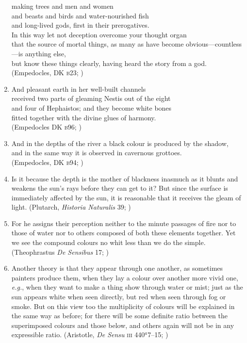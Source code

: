 \documentclass[10pt]{article}
\begin{document}
\begin{enumerate}
    making trees and men and women\\
    and beasts and birds and water-nourished fish\\
    and long-lived gods, first in their prerogatives.\\
    In this way let not deception overcome your thought organ\\
    that the source of mortal things, as many as have become obvious---countless---is anything else,\\
    but know these things clearly, having heard the story from a god.\\ 
    (Empedocles, DK \textsc{b}23; \citealt[27 231]{Inwood:2001ve})
    \item And pleasant earth in her well-built channels\\
    received two parts of gleaming Nestis out of the eight\\
    and four of Hephaistos; and they become white bones\\
    fitted together with the divine glues of harmony.\\
    (Empedocles DK \textsc{b}96; \citealt[62 245]{Inwood:2001ve})
    \item And in the depths of the river a black colour is produced by the shadow,\\
    and in the same way it is observed in cavernous grottoes.\\
    (Empedocles, DK \textsc{b}94; \citealt[105 261]{Inwood:2001ve})
    \item Is it because the depth is the mother of blackness inasmuch as it blunts and weakens the sun's rays before they can get to it? But since the surface is immediately affected by the sun, it is reasonable that it receives the gleam of light.  (Plutarch, \emph{Historia Naturalis} 39; \citealt[\textsc{CTXT}-87 137--138]{Inwood:2001ve})
	\item For he assigns their perception neither to the minute passages of fire nor to those of water nor to others composed of both these elements together. Yet we see the compound colours no whit less than we do the simple. (Theophrastus \emph{De Sensibus} 17; \citealt{Stratton:1917vn})
    \item Another theory is that they appear through one another, as sometimes painters produce them, when they lay a colour over another more vivid one, \emph{e.g.}, when they want to make a thing show through water or mist; just as the sun appears white when seen directly, but red when seen through fog or smoke. But on this view too the multiplicity of colours will be explained in the same way as before; for there will be some definite ratio between the superimposed colours and those below, and others again will not be in any expressible ratio. (Aristotle, \emph{De Sensu} \textsc{iii} 440\( ^{a} \)7--15; \citealt[235]{Hett:1936fk})

\end{enumerate}
\end{document}

